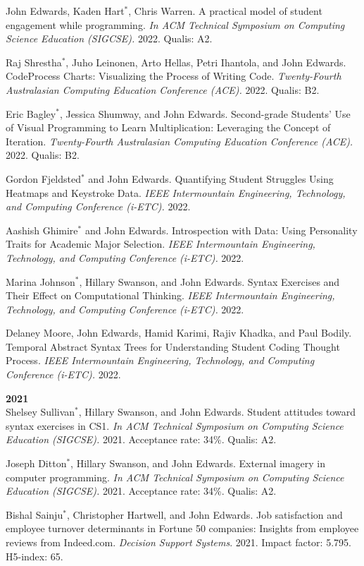 \documentclass[margin,line]{res}
\newcommand{\pnum}[1]{}
\begin{document}
\begin{resume}
\pnum{41} John Edwards, Kaden Hart$^*$, Chris Warren. A practical model of student engagement while programming. \textit{In ACM Technical Symposium on Computing Science Education (SIGCSE).} 2022. Qualis: A2.

\pnum{40} Raj Shrestha$^*$, Juho Leinonen, Arto Hellas, Petri Ihantola, and John Edwards. CodeProcess Charts: Visualizing the Process of Writing Code. \textit{Twenty-Fourth Australasian Computing Education Conference (ACE).} 2022. Qualis: B2.

\pnum{39} Eric Bagley$^*$, Jessica Shumway, and John Edwards. Second-grade Students' Use of Visual Programming to Learn Multiplication: Leveraging the Concept of Iteration. \textit{Twenty-Fourth Australasian Computing Education Conference (ACE).} 2022. Qualis: B2.

\pnum{38} Gordon Fjeldsted$^*$ and John Edwards. Quantifying Student Struggles Using Heatmaps and Keystroke Data. \textit{IEEE Intermountain Engineering, Technology, and Computing Conference (i-ETC).} 2022.

\pnum{37} Aashish Ghimire$^*$ and John Edwards. Introspection with Data: Using Personality Traits for Academic Major Selection. \textit{IEEE Intermountain Engineering, Technology, and Computing Conference (i-ETC).} 2022.

\pnum{36} Marina Johnson$^*$, Hillary Swanson, and John Edwards. Syntax Exercises and Their Effect on Computational Thinking. \textit{IEEE Intermountain Engineering, Technology, and Computing Conference (i-ETC).} 2022.

\pnum{35} Delaney Moore, John Edwards, Hamid Karimi, Rajiv Khadka, and Paul Bodily. Temporal Abstract Syntax Trees for Understanding Student Coding Thought Process. \textit{IEEE Intermountain Engineering, Technology, and Computing Conference (i-ETC).} 2022.

\textbf{2021} \\
\pnum{34} Shelsey Sullivan$^*$, Hillary Swanson, and John Edwards. Student attitudes toward syntax exercises in CS1. \textit{In ACM Technical Symposium on Computing Science Education (SIGCSE).} 2021. Acceptance rate: 34\%. Qualis: A2.

\pnum{33} Joseph Ditton$^*$, Hillary Swanson, and John Edwards. External imagery in computer programming. \textit{In ACM Technical Symposium on Computing Science Education (SIGCSE).} 2021. Acceptance rate: 34\%. Qualis: A2.

\pnum{32} Bishal Sainju$^*$, Christopher Hartwell, and John Edwards. Job satisfaction and employee turnover determinants in Fortune 50 companies: Insights from employee reviews from Indeed.com. \textit{Decision Support Systems}. 2021. Impact factor: 5.795. H5-index: 65.


\end{resume}
\end{document}
